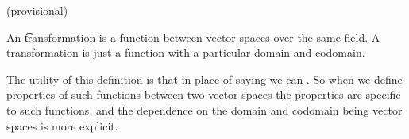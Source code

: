 

(provisional)

An \t{transformation} is a function between vector spaces over the same field.
A transformation is just a function with a particular domain and codomain.

The utility of this definition is that in place of saying  we can .
So when we define properties of such functions between two vector spaces the properties are specific to such functions, and the dependence on the domain and codomain being vector spaces is more explicit.
